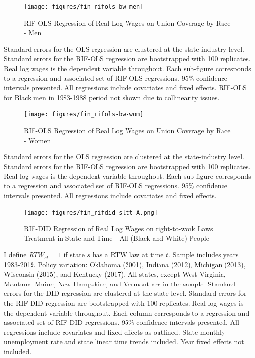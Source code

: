 \documentclass[11pt]{article}
\begin{document}
{\pagebreak
\begin{landscape}
\begin{figure}[ht!]
\centering
    \caption{RIF-OLS Regression of Real Log Wages on Union Coverage by Race - Men}\label{fig:rifols-bw-men}
    \texttt{[image: figures/fin\_rifols-bw-men]}
\end{figure}
\footnotesize{Standard errors for the OLS regression are clustered at the state-industry level. Standard errors for the RIF-OLS regression are bootstrapped with 100 replicates. Real log wages is the dependent variable throughout. Each sub-figure corresponds to a regression and associated set of RIF-OLS regressions. 95\% confidence intervals presented. All regressions include covariates and fixed effects. RIF-OLS for Black men in 1983-1988 period not shown due to collinearity issues.}
\end{landscape}

\pagebreak
\begin{landscape}
\begin{figure}[ht!]
\centering
    \caption{RIF-OLS Regression of Real Log Wages on Union Coverage by Race - Women}\label{fig:rifols-bw-wom}
    \texttt{[image: figures/fin\_rifols-bw-wom]}
\end{figure}
\footnotesize{Standard errors for the OLS regression are clustered at the state-industry level. Standard errors for the RIF-OLS regression are bootstrapped with 100 replicates. Real log wages is the dependent variable throughout. Each sub-figure corresponds to a regression and associated set of RIF-OLS regressions. 95\% confidence intervals presented. All regressions include covariates and fixed effects.}
\end{landscape}

\pagebreak
\begin{landscape}
\begin{figure}[ht!]
\centering
    \caption{RIF-DID Regression of Real Log Wages on right-to-work Laws Treatment in State and Time - All (Black and White) People}\label{fig:rifdid-sltt-A}
    \texttt{[image: figures/fin\_rifdid-sltt-A.png]}
\end{figure}
\footnotesize{I define $RTW_{st} = 1$ if state $s$ has a RTW law at time $t$. Sample includes years 1983-2019. Policy variation: Oklahoma (2001), Indiana (2012), Michigan (2013), Wisconsin (2015), and Kentucky (2017). All states, except West Virginia, Montana, Maine, New Hampshire, and Vermont are in the sample. Standard errors for the DID regression are clustered at the state-level. Standard errors for the RIF-DID regression are bootstrapped with 100 replicates. Real log wages is the dependent variable throughout. Each column corresponds to a regression and associated set of RIF-DID regressions. 95\% confidence intervals presented. All regressions include covariates and fixed effects as outlined. State monthly unemployment rate and state linear time trends included. Year fixed effects not included.}
\end{landscape}

}
\end{document}
